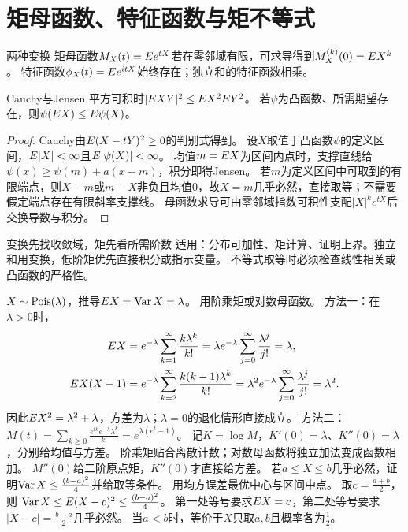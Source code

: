 \section{矩母函数、特征函数与矩不等式}\label{sec:45}
\begin{definition}{两种变换}
矩母函数$M_X(t)=E e^{tX}$若在零邻域有限，可求导得到$M_X^{(k)}(0)=E X^k$。
特征函数$\phi_X(t)=E e^{itX}$始终存在；独立和的特征函数相乘。
\end{definition}
\begin{theorem}{Cauchy与Jensen}
平方可积时$|E XY|^2\le E X^2E Y^2$。
若$\psi$为凸函数、所需期望存在，则$\psi(E X)\le E\psi(X)$。
\end{theorem}
\begin{proof}
Cauchy由$E(X-tY)^2\ge0$的判别式得到。
设$X$取值于凸函数$\psi$的定义区间，$E|X|<\infty$且$E|\psi(X)|<\infty$。
均值$m=E X$为区间内点时，支撑直线给$\psi(x)\ge\psi(m)+a(x-m)$，积分即得Jensen。
若$m$为定义区间中可取到的有限端点，则$X-m$或$m-X$非负且均值0，故$X=m$几乎必然，直接取等；不需要假定端点存在有限斜率支撑线。
母函数求导可由零邻域指数可积性支配$|X|^ke^{tX}$后交换导数与积分。
\end{proof}
\begin{method}{变换先找收敛域，矩先看所需阶数}
适用：分布可加性、矩计算、证明上界。独立和用变换，低阶矩优先直接积分或指示变量。
不等式取等时必须检查线性相关或凸函数的严格性。
\end{method}
{$X\sim\operatorname{Pois}(\lambda)$，推导$E X=\operatorname{Var} X=\lambda$。}
{用阶乘矩或对数母函数。}
{方法一：在$\lambda>0$时，
\begin{align*}
E X&=e^{-\lambda}\sum_{k=1}^\infty\dfrac{k\lambda^k}{k!}
=\lambda e^{-\lambda}\sum_{j=0}^\infty\dfrac{\lambda^j}{j!}=\lambda,\\
E X(X-1)&=e^{-\lambda}\sum_{k=2}^\infty\dfrac{k(k-1)\lambda^k}{k!}
=\lambda^2 e^{-\lambda}\sum_{j=0}^\infty\dfrac{\lambda^j}{j!}=\lambda^2.
\end{align*}
因此$E X^2=\lambda^2+\lambda$，方差为$\lambda$；$\lambda=0$的退化情形直接成立。
方法二：$M(t)=\sum_{k\ge0}\frac{e^{tk}e^{-\lambda}\lambda^k}{k!}=e^{\lambda(e^t-1)}$。
记$K=\log M$，$K'(0)=\lambda$、$K''(0)=\lambda$，分别给均值与方差。}
{阶乘矩贴合离散计数；对数母函数将独立加法变成函数相加。}
{$M''(0)$给二阶原点矩，$K''(0)$才直接给方差。}
{若$a\le X\le b$几乎必然，证明$\operatorname{Var} X\le\frac{(b-a)^2}{4}$并给取等条件。}
{用均方误差最优中心与区间中点。}
{取$c=\frac{a+b}{2}$，则
$\operatorname{Var} X\le E(X-c)^2\le\frac{(b-a)^2}{4}$。
第一处等号要求$E X=c$，第二处等号要求$|X-c|=\frac{b-a}{2}$几乎必然。
当$a<b$时，等价于$X$只取$a,b$且概率各为$\frac{1}{2}$。}
